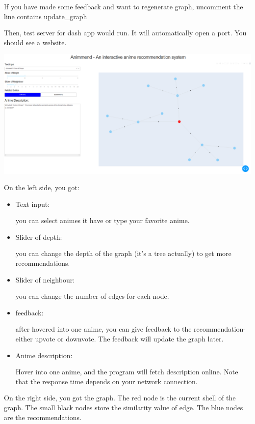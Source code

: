 \documentclass[12pt]{article}
\begin{document}
\begin{enumerate}
\begin{text}
If you have made some feedback and want to regenerate graph, uncomment the line contains update\_graph

Then, test server for dash app would run. It will automatically open a port. You should see a website.

\includegraphics[scale=0.3]{sample}

On the left side, you got:

\begin{itemize}
    \item Text input: 

    you can select animes it have or type your favorite anime.

    \item Slider of depth: 

    you can change the depth of the graph (it's a tree actually) to get more recommendations.

    \item Slider of neighbour:

    you can change the number of edges for each node.

    \item feedback:

    after hovered into one anime, you can give feedback to the recommendation- either upvote or downvote. The feedback will update the graph later.

    \item Anime description:

    Hover into one anime, and the program will fetch description online. Note that the response time depends on your network connection.
\end{itemize}

On the right side, you got the graph. The red node is the current shell of the graph. The small black nodes store the similarity value of edge. The blue nodes are the recommendations.


\end{text}
\end{enumerate}
\end{document}
